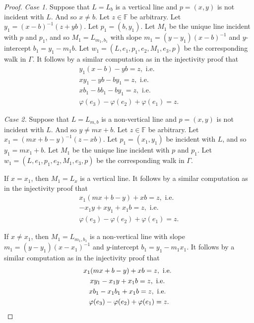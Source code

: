 \documentclass[11pt]{article}
\theoremstyle{definition}
\begin{document}
\begin{proof}
\textit{Case 1.}  Suppose that $L = L_b$ is a vertical line and $p = (x,y)$ is not incident with $L$.  And so $x \neq b$.  Let $z \in \mathbb{F}$ be arbitrary.  Let $y_1 = (x-b)^{-1}(z + yb).$  Let $p_1 = (b,y_1)$.  Let $M_1$ be the unique line incident with $p$ and $p_1$, and so $M_1 = L_{m_1,b_1}$ with slope $m_1 = (y-y_1)(x-b)^{-1}$ and $y$-intercept $b_1 = y_1 - m_1 b.$  Let $w_1 = (L,e_1,p_1,e_2,M_1,e_3,p)$ be the corresponding walk in $\Gamma$.  It follows by a similar computation as in the injectivity proof that 
\begin{gather*}
y_1(x-b) - yb = z, \text{  i.e.  } \\
xy_1 - yb - by_1 =z, \text{  i.e.  } \\
xb_1 - bb_1 - by_1 = z, \text{  i.e.  } \\
\varphi(e_3) - \varphi(e_2) + \varphi(e_1) = z.
\end{gather*}

\textit{Case 2.}  Suppose that $L = L_{m,b}$ is a non-vertical line and $p = (x,y)$ is not incident with $L$.  And so $y \neq mx + b$.  Let $z \in \mathbb{F}$ be arbitrary.  Let  $x_1 = (mx + b - y)^{-1} (z - xb).$  Let $p_1 = (x_1, y_1)$ be incident with $L$, and so $y_1 = mx_1 + b$.  Let $M_1$ be the unique line incident with $p$ and $p_1$.  Let $w_1 = (L,e_1,p_1,e_2,M_1,e_3,p)$ be the corresponding walk in $\Gamma$.  

If $x=x_1$, then $M_1 = L_x$ is a vertical line.   It follows by a similar computation as in the injectivity proof that
\begin{gather*}
x_1(mx + b - y) + xb = z, \text{ i.e. } \\
- x_1y + xy_1 + x_1b = z, \text{ i.e. } \\
\varphi(e_3) - \varphi(e_2) + \varphi(e_1) = z.
\end{gather*}

If $x \neq x_1$, then $M_1 = L_{m_1,b_1}$ is a non-vertical line with slope $m_1 = (y-y_1)(x-x_1)^{-1}$ and $y$-intercept $b_1 = y_1 - m_1 x_1.$   It follows by a similar computation as in the injectivity proof that
\begin{gather*}
x_1(mx + b - y) + xb = z, \text{ i.e. } \\
xy_1 - x_1y + x_1b = z, \text{ i.e. } \\
xb_1 - x_1b_1 + x_1b = z, \text{  i.e.  } \\
\varphi(e_3) - \varphi(e_2) + \varphi(e_1) = z.
\qedhere
\end{gather*}
\end{proof}
\end{document}
